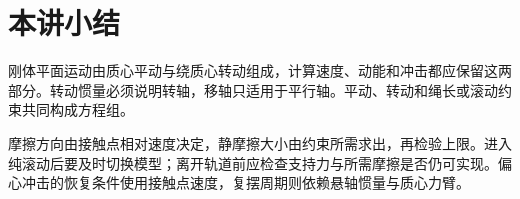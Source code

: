 \section{本讲小结}
刚体平面运动由质心平动与绕质心转动组成，计算速度、动能和冲击都应保留这两部分。转动惯量必须说明转轴，移轴只适用于平行轴。平动、转动和绳长或滚动约束共同构成方程组。

摩擦方向由接触点相对速度决定，静摩擦大小由约束所需求出，再检验上限。进入纯滚动后要及时切换模型；离开轨道前应检查支持力与所需摩擦是否仍可实现。偏心冲击的恢复条件使用接触点速度，复摆周期则依赖悬轴惯量与质心力臂。
